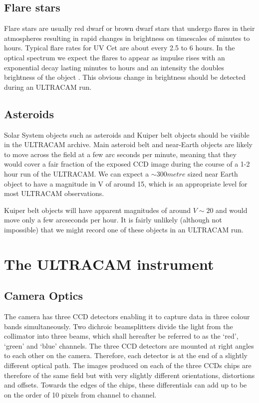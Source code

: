\subsection{Flare stars}
Flare stars are usually red dwarf or brown dwarf stars that undergo flares in their atmospheres resulting in rapid changes in brightness on timescales of minutes to hours. Typical flare rates for {UV Cet} are about every 2.5 to 6 hours. In the optical spectrum we expect the flares to appear as impulse rises with an exponential decay lasting minutes to hours and an intensity the doubles brightness of the object \cite{stellaractivity}. This obvious change in brightness should be detected during an ULTRACAM run. 

\subsection{Asteroids}
Solar System objects such as asteroids and Kuiper belt objects should be visible in the ULTRACAM archive. Main asteroid belt and near-Earth objects are likely to move across the field at a few arc seconds per minute, meaning that they would cover a fair fraction of the exposed CCD image during the course of a 1-2 hour run of the ULTRACAM. We can expect a $\sim 300 metre$ sized near Earth object to have a magnitude in V of around 15, \cite{neosmalltelescope} which is an appropriate level for most ULTRACAM observations. 

Kuiper belt objects will have apparent magnitudes of around $V\sim 20$ and would move only a few arcseconds per hour. It is fairly unlikely (although not impossible) that we might record one of these objects in an ULTRACAM run. 

\section{The ULTRACAM instrument} 

\subsection{Camera Optics}

The camera has three CCD detectors enabling it to capture data in three colour bands simultaneously. Two dichroic beamsplitters divide the light from the collimator into three beams, which shall hereafter be referred to as the `red', `green' and `blue' channels. The three CCD detectors are mounted at right angles to each other on the camera. Therefore, each detector is at the end of a slightly different optical path. The images produced on each of the three CCDs chips are therefore of the same field but with very slightly different orientations, distortions and offsets. Towards the edges of the chips, these differentials can add up to be on the order of 10 pixels from channel to channel. 

